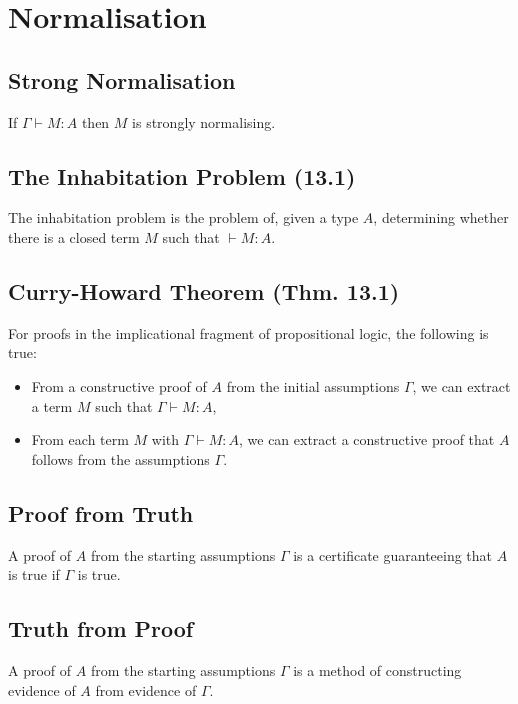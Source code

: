 \section{Normalisation}

\subsection{Strong Normalisation}

If $\Gamma \vdash M : A$ then $M$ is strongly normalising.

\subsection{The Inhabitation Problem (13.1)}

The inhabitation problem is the problem of, given a type $A$, determining
whether there is a closed term $M$ such that $\vdash M : A$.

\subsection{Curry-Howard Theorem (Thm. 13.1)}

For proofs in the implicational fragment of propositional
logic, the following is true: \begin{itemize}
    \item From a constructive proof of $A$ from the initial assumptions
        $\Gamma$, we can extract a term $M$ such that $\Gamma \vdash M : A$,
    \item From each term $M$ with $\Gamma \vdash M : A$, we can extract
        a constructive proof that $A$ follows from the assumptions $\Gamma$.
\end{itemize}

\subsection{Proof from Truth}

A proof of $A$ from the starting assumptions $\Gamma$ is a certificate
guaranteeing that $A$ is true if $\Gamma$ is true.

\subsection{Truth from Proof}

A proof of $A$ from the starting assumptions $\Gamma$ is a method
of constructing evidence of $A$ from evidence of $\Gamma$.

